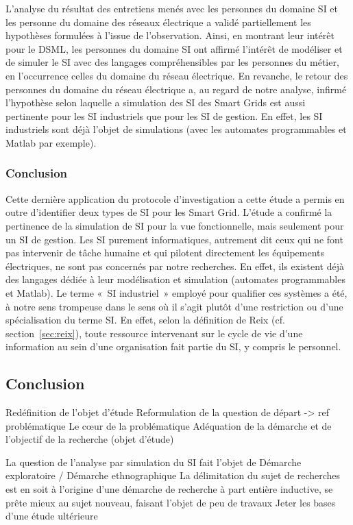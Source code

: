 L'analyse du résultat des entretiens menés avec les personnes du domaine SI et les personne du domaine des réseaux électrique a validé partiellement les hypothèses formulées à l'issue de l'observation. Ainsi, en montrant leur intérêt pour le DSML, les personnes du domaine SI ont affirmé l'intérêt de modéliser et de simuler le SI avec des langages compréhensibles par les personnes du métier, en l'occurrence celles du domaine du réseau électrique. 
En revanche, le retour des personnes du domaine du réseau électrique a, au regard de notre analyse, infirmé l'hypothèse selon laquelle a simulation des SI des Smart Grids est aussi pertinente pour les SI industriels que pour les SI de gestion. En effet, les SI industriels sont déjà l'objet de simulations (avec les automates programmables et Matlab par exemple).

			\subsubsection{Conclusion}
Cette dernière application du protocole d'investigation a cette étude a permis en outre d'identifier deux types de SI pour les Smart Grid. L'étude a confirmé la pertinence de la simulation de SI pour la vue fonctionnelle, mais seulement pour un SI de gestion. Les SI purement informatiques, autrement dit ceux qui ne font pas intervenir de tâche humaine et qui pilotent directement les équipements électriques, ne sont pas concernés par notre recherches. En effet, ils existent déjà des langages dédiée à leur modélisation et simulation (automates programmables et Matlab). Le terme «~SI industriel~» employé pour qualifier ces systèmes a été, à notre sens trompeuse dans le sens où il s'agit plutôt d'une restriction ou d'une spécialisation du terme SI. En effet, selon la définition de Reix (cf. section~\ref{sec:reix}), toute ressource intervenant sur le cycle de vie d'une information au sein d'une organisation fait partie du SI, y compris le personnel. 
	
	
		\subsection{Conclusion}
Redéfinition de l'objet d'étude
Reformulation de la question de départ -> ref problématique 
Le cœur de la problématique 
Adéquation de la démarche et de l'objectif de la recherche (objet d'étude)
	
La question de l'analyse par simulation du SI fait l'objet de 
Démarche exploratoire / Démarche ethnographique 
La délimitation du sujet de recherches est en soit à l'origine d'une démarche de 
recherche à part entière  inductive, se prête mieux au sujet nouveau, faisant 
l'objet de peu de travaux
Jeter les bases d'une étude ultérieure


